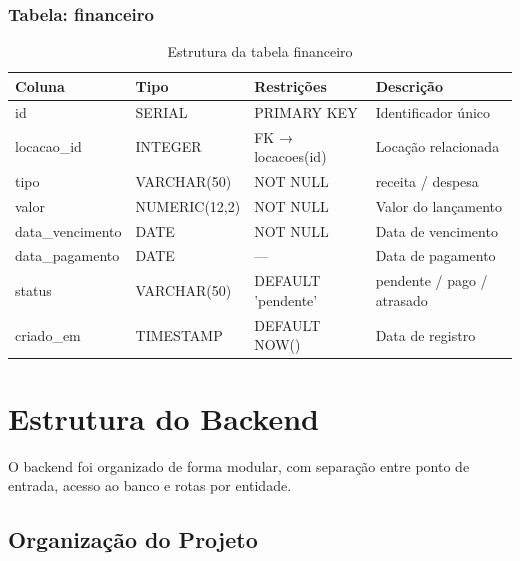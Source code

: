 \documentclass[12pt, a4paper]{article}
\newcommand{\thead}[1]{\cellcolor{tableheader}\color{white}\bfseries #1}
\newcommand{\talt}{\rowcolor{tablerowalt}}
\begin{document}
\subsubsection{Tabela: financeiro}

\begin{table}[H]
\centering
\begin{tabularx}{\textwidth}{|l|l|l|X|}
\hline
\thead{Coluna} & \thead{Tipo} & \thead{Restrições} & \thead{Descrição} \\
\hline
id               & SERIAL        & PRIMARY KEY          & Identificador único \\
\talt locacao\_id     & INTEGER       & FK → locacoes(id)    & Locação relacionada \\
tipo             & VARCHAR(50)   & NOT NULL             & receita / despesa \\
\talt valor           & NUMERIC(12,2) & NOT NULL             & Valor do lançamento \\
data\_vencimento & DATE          & NOT NULL             & Data de vencimento \\
\talt data\_pagamento & DATE          & —                    & Data de pagamento \\
status           & VARCHAR(50)   & DEFAULT 'pendente'   & pendente / pago / atrasado \\
\talt criado\_em      & TIMESTAMP     & DEFAULT NOW()        & Data de registro \\
\hline
\end{tabularx}
\caption{Estrutura da tabela financeiro}
\end{table}

\section{Estrutura do Backend}

O backend foi organizado de forma modular, com separação entre ponto de entrada, acesso ao banco e rotas por entidade.

\subsection{Organização do Projeto}
\end{document}
